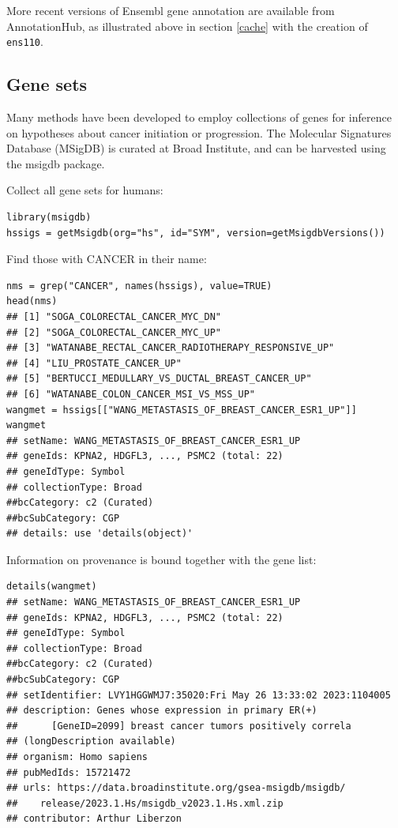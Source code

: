 \documentclass[graybox]{svmult}
\begin{document}
More recent versions of Ensembl gene annotation are available
from AnnotationHub, as illustrated above in section \ref{cache} with
the creation of \texttt{ens110}.

\subsection{Gene sets}\label{gene-sets}

Many methods have been developed to employ collections
of genes for inference on hypotheses about cancer
initiation or progression. The Molecular Signatures Database (MSigDB)
is curated at Broad Institute, and can be harvested
using the msigdb package.

Collect all gene sets for humans:

\begin{shaded}
\begin{verbatim}
library(msigdb)
hssigs = getMsigdb(org="hs", id="SYM", version=getMsigdbVersions())
\end{verbatim}
\end{shaded}

Find those with CANCER in their name:

\begin{shaded}
\begin{verbatim}
nms = grep("CANCER", names(hssigs), value=TRUE)
head(nms)
## [1] "SOGA_COLORECTAL_CANCER_MYC_DN"
## [2] "SOGA_COLORECTAL_CANCER_MYC_UP"
## [3] "WATANABE_RECTAL_CANCER_RADIOTHERAPY_RESPONSIVE_UP"
## [4] "LIU_PROSTATE_CANCER_UP"
## [5] "BERTUCCI_MEDULLARY_VS_DUCTAL_BREAST_CANCER_UP"
## [6] "WATANABE_COLON_CANCER_MSI_VS_MSS_UP"
wangmet = hssigs[["WANG_METASTASIS_OF_BREAST_CANCER_ESR1_UP"]]
wangmet
## setName: WANG_METASTASIS_OF_BREAST_CANCER_ESR1_UP
## geneIds: KPNA2, HDGFL3, ..., PSMC2 (total: 22)
## geneIdType: Symbol
## collectionType: Broad
##bcCategory: c2 (Curated)
##bcSubCategory: CGP
## details: use 'details(object)'
\end{verbatim}
\end{shaded}

Information on provenance is bound together with the gene list:

\begin{shaded}
\begin{verbatim}
details(wangmet)
## setName: WANG_METASTASIS_OF_BREAST_CANCER_ESR1_UP
## geneIds: KPNA2, HDGFL3, ..., PSMC2 (total: 22)
## geneIdType: Symbol
## collectionType: Broad
##bcCategory: c2 (Curated)
##bcSubCategory: CGP
## setIdentifier: LVY1HGGWMJ7:35020:Fri May 26 13:33:02 2023:1104005
## description: Genes whose expression in primary ER(+) 
##      [GeneID=2099] breast cancer tumors positively correla
## (longDescription available)
## organism: Homo sapiens
## pubMedIds: 15721472
## urls: https://data.broadinstitute.org/gsea-msigdb/msigdb/
##    release/2023.1.Hs/msigdb_v2023.1.Hs.xml.zip
## contributor: Arthur Liberzon
\end{verbatim}
\end{shaded}
\end{document}
